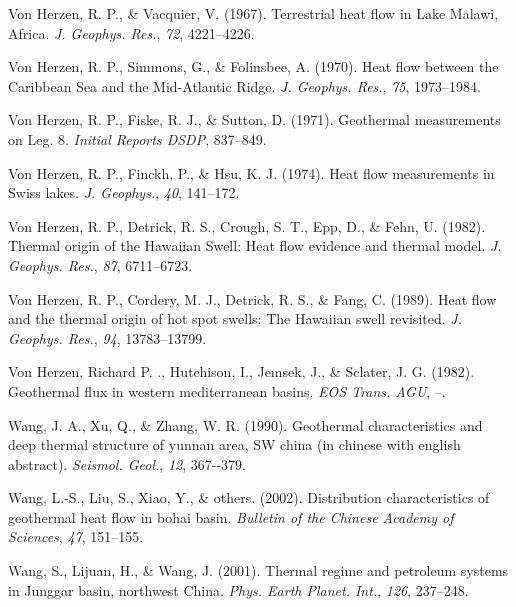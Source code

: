 \documentclass[draft,linenumbers]{agujournal2018}
\begin{document}
\leavevmode{}%
Von Herzen, R. P., \& Vacquier, V. (1967). Terrestrial heat flow in
{Lake Malawi, Africa}. \emph{J. Geophys. Res.}, \emph{72}, 4221--4226.

\leavevmode{}%
Von Herzen, R. P., Simmons, G., \& Folinsbee, A. (1970). Heat flow
between the {Caribbean Sea and the Mid-Atlantic Ridge}. \emph{J.
Geophys. Res.}, \emph{75}, 1973--1984.

\leavevmode{}%
Von Herzen, R. P., Fiske, R. J., \& Sutton, D. (1971). Geothermal
measurements on {Leg. 8}. \emph{Initial Reports DSDP}, 837--849.

\leavevmode{}%
Von Herzen, R. P., Finckh, P., \& Hsu, K. J. (1974). Heat flow
measurements in {Swiss} lakes. \emph{J. Geophys.}, \emph{40}, 141--172.

\leavevmode{}%
Von Herzen, R. P., Detrick, R. S., Crough, S. T., Epp, D., \& Fehn, U.
(1982). Thermal origin of the {Hawaiian Swell}: Heat flow evidence and
thermal model. \emph{J. Geophys. Res.}, \emph{87}, 6711--6723.

\leavevmode{}%
Von Herzen, R. P., Cordery, M. J., Detrick, R. S., \& Fang, C. (1989).
Heat flow and the thermal origin of hot spot swells: The {Hawaiian}
swell revisited. \emph{J. Geophys. Res.}, \emph{94}, 13783--13799.

\leavevmode{}%
Von Herzen, Richard P. ., Hutchison, I., Jemsek, J., \& Sclater, J. G.
(1982). Geothermal flux in western mediterranean basins. \emph{EOS
Trans. AGU}, --.

\leavevmode{}%
Wang, J. A., Xu, Q., \& Zhang, W. R. (1990). Geothermal characteristics
and deep thermal structure of yunnan area, SW china (in chinese with
english abstract). \emph{Seismol. Geol.}, \emph{12}, 367-\/-379.

\leavevmode{}%
Wang, L.-S., Liu, S., Xiao, Y., \& others. (2002). Distribution
characteristics of geothermal heat flow in bohai basin. \emph{Bulletin
of the Chinese Academy of Sciences}, \emph{47}, 151--155.

\leavevmode{}%
Wang, S., Lijuan, H., \& Wang, J. (2001). Thermal regime and petroleum
systems in {Junggar} basin, northwest {China}. \emph{Phys. Earth Planet.
Int.}, \emph{126}, 237--248.
\end{document}
